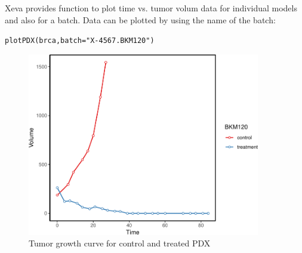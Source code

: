 \documentclass{article}\usepackage[]{graphicx}\usepackage[usenames,dvipsnames]{color}
\newcommand{\hlstr}[1]{\textcolor[rgb]{0.251,0.627,0.251}{#1}}%
\newcommand{\hlstd}[1]{\textcolor[rgb]{0.251,0.251,0.251}{#1}}%
\newcommand{\hlkwc}[1]{\textcolor[rgb]{0.251,0.251,0.251}{#1}}%
\newcommand{\hlkwd}[1]{\textcolor[rgb]{0.878,0.439,0.125}{#1}}%
\newenvironment{knitrout}{}{} %
\begin{document}
Xeva provides function to plot time vs. tumor volum data for individual models and also for a batch. Data can be plotted by using the name of the batch:
\begin{knitrout}
\color{fgcolor}\begin{kframe}
\begin{alltt}
\hlkwd{plotPDX}\hlstd{(brca,} \hlkwc{batch} \hlstd{=} \hlstr{"X-4567.BKM120"}\hlstd{)}
\end{alltt}
\end{kframe}\begin{figure}
\includegraphics[width=4in]{figure/plot1-1} \caption{Tumor growth curve for control and treated PDX}\label{fig:plot1}
\end{figure}

\end{knitrout}
\end{document}
